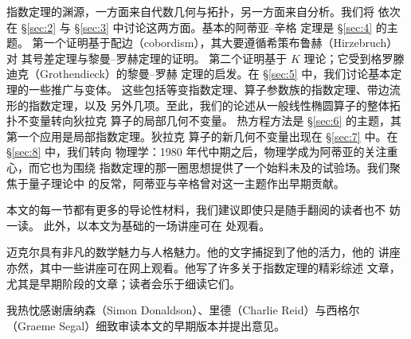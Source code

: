 \documentclass[11pt]{amsart}
\theoremstyle{definition}
\theoremstyle{remark}
\theoremstyle{plain}
\numberwithin{equation}{section}
\renewcommand{\:}{\colon}
\begin{document}
指数定理的渊源，一方面来自代数几何与拓扑，另一方面来自分析。我们将
依次在 \S\ref{sec:2} 与 \S\ref{sec:3} 中讨论这两方面。基本的阿蒂亚–辛格
定理是 \S\ref{sec:4} 的主题。
第一个证明基于配边（cobordism），其大要遵循希策布鲁赫（Hirzebruch）对
其号差定理与黎曼–罗赫定理的证明。
第二个证明基于 $K$ 理论；它受到格罗滕迪克（Grothendieck）的黎曼–罗赫
定理的启发。在 \S\ref{sec:5} 中，我们讨论基本定理的一些推广与变体。
这些包括等变指数定理、算子参数族的指数定理、带边流形的指数定理，以及
另外几项。至此，我们的论述从一般线性椭圆算子的整体拓扑不变量转向狄拉克
算子的局部几何不变量。
热方程方法是 \S\ref{sec:6} 的主题，其第一个应用是局部指数定理。狄拉克
算子的新几何不变量出现在 \S\ref{sec:7} 中。在 \S\ref{sec:8} 中，我们转向
物理学：1980 年代中期之后，物理学成为阿蒂亚的关注重心，而它也为围绕
指数定理的那一圈思想提供了一个始料未及的试验场。我们聚焦于量子理论中
的反常，阿蒂亚与辛格曾对这一主题作出早期贡献。

本文的每一节都有更多的导论性材料，我们建议即使只是随手翻阅的读者也不
妨一读。
此外，以本文为基础的一场讲座可在 \cite{F1} 处观看。

迈克尔具有非凡的数学魅力与人格魅力。他的文字捕捉到了他的活力，他的
讲座亦然，其中一些讲座可在网上观看。他写了许多关于指数定理的精彩综述
文章，尤其是早期阶段的文章；读者会乐于细读它们。

我热忱感谢唐纳森（Simon Donaldson）、里德（Charlie Reid）与西格尔
（Graeme Segal）细致审读本文的早期版本并提出意见。
\end{document}
